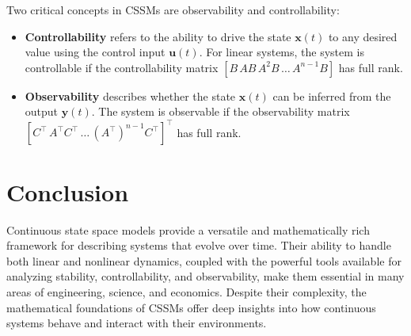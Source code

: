 \documentclass[12pt]{article}
\begin{document}
Two critical concepts in CSSMs are observability and controllability:
\begin{itemize}
    \item \textbf{Controllability} refers to the ability to drive the state \( \mathbf{x}(t) \) to any desired value using the control input \( \mathbf{u}(t) \). For linear systems, the system is controllable if the controllability matrix \( [B \, AB \, A^2B \, \dots \, A^{n-1}B] \) has full rank.
    \item \textbf{Observability} describes whether the state \( \mathbf{x}(t) \) can be inferred from the output \( \mathbf{y}(t) \). The system is observable if the observability matrix \( [C^\top \, A^\top C^\top \, \dots \, (A^\top)^{n-1}C^\top]^\top \) has full rank.
\end{itemize}



\section{Conclusion}

Continuous state space models provide a versatile and mathematically rich framework for describing systems that evolve over time. Their ability to handle both linear and nonlinear dynamics, coupled with the powerful tools available for analyzing stability, controllability, and observability, make them essential in many areas of engineering, science, and economics. Despite their complexity, the mathematical foundations of CSSMs offer deep insights into how continuous systems behave and interact with their environments.
\end{document}
